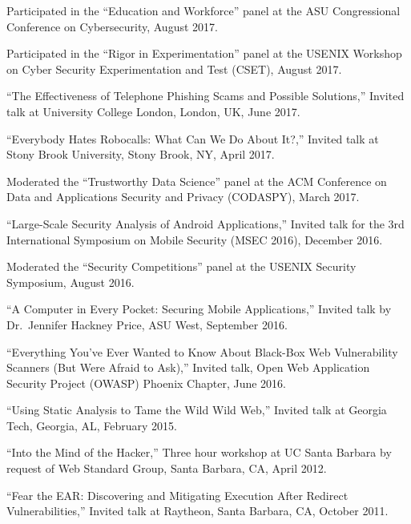 \documentclass[11pt,letterpaper,sans]{moderncv}
\begin{document}
\begin{etaremune}

  \item Participated in the ``Education and Workforce'' panel at the
    ASU Congressional Conference on Cybersecurity, August 2017. 
  
  \item Participated in the ``Rigor in Experimentation'' panel at the
    USENIX Workshop on Cyber Security Experimentation and Test (CSET),
    August 2017.

  \item ``The Effectiveness of Telephone Phishing Scams and Possible Solutions,''
    Invited talk at University College London, London, UK, June
    2017.
  
  \item ``Everybody Hates Robocalls: What Can We Do About It?,''
    Invited talk at Stony Brook University, Stony Brook, NY, April
    2017.

  \item Moderated the ``Trustworthy Data Science'' panel at the ACM
    Conference on Data and Applications Security and Privacy
    (CODASPY), March 2017.

  \item ``Large-Scale Security Analysis of Android Applications,''
    Invited talk for the 3rd International Symposium on Mobile
    Security (MSEC 2016), December 2016.

  \item Moderated the ``Security Competitions'' panel at the USENIX
    Security Symposium, August 2016.

  \item ``A Computer in Every Pocket: Securing Mobile Applications,''
    Invited talk by Dr.\ Jennifer Hackney Price, ASU West, September
    2016.

  \item ``Everything You've Ever Wanted to Know About Black-Box Web
    Vulnerability Scanners (But Were Afraid to Ask),'' Invited talk,
    Open Web Application Security Project (OWASP) Phoenix Chapter,
    June 2016.

  \item ``Using Static Analysis to Tame the Wild Wild Web,'' Invited
    talk at Georgia Tech, Georgia, AL, February 2015.
 
  \item ``Into the Mind of the Hacker,'' Three hour workshop at UC
    Santa Barbara by request of Web Standard Group, Santa Barbara, CA,
    April 2012.

  \item ``Fear the EAR: Discovering and Mitigating Execution After
    Redirect Vulnerabilities,'' Invited talk at Raytheon, Santa
    Barbara, CA, October 2011.

\end{etaremune}
\end{document}
